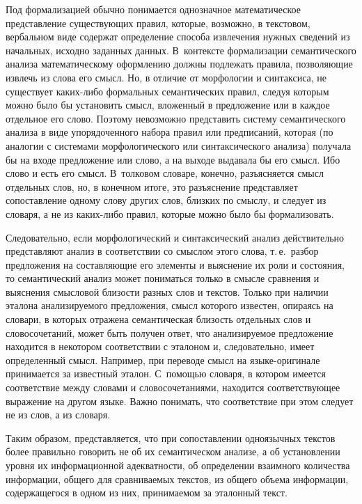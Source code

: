 \begin{multicols}{2}
   Под формализацией обычно понимается однозначное математическое 
представление существующих правил, которые, возможно, в текстовом, 
вербальном виде содержат определение способа извлечения нужных 
сведений из начальных, исходно заданных данных. В~контексте 
формализации семантического анализа математическому оформлению 
должны подлежать правила, позволяющие извлечь из слова его смысл. Но, в 
отличие от морфологии и синтаксиса, не существует ка\-ких-ли\-бо 
формальных семантических правил, следуя которым можно было бы 
установить смысл, вложенный в предложение или в каждое отдельное его 
слово. Поэтому невозможно представить систему семантического анализа в 
виде упорядоченного набора правил или предписаний, которая (по аналогии 
с системами морфологического или синтаксического анализа) получала бы 
на входе предложение или слово, а на выходе выдавала бы его смысл. Ибо 
слово и есть его смысл. В~толковом словаре, конечно, разъясняется смысл 
отдельных слов, но, в конечном итоге, это разъяснение представляет 
сопоставление одному слову других слов, близких по смыслу, и следует из 
словаря, а не из каких-либо правил, которые можно было бы формализовать.
   
Следовательно, если морфологический и синтаксический анализ действительно 
представляют анализ в соответствии со смыслом этого слова, т.\,е.\ разбор 
предложения на составляющие его элементы и выяснение их роли и 
состояния, то семантический анализ может пониматься только в смысле 
сравнения и выяснения смысловой близости разных слов и текстов. Только 
при наличии эталона анализируемого предложения, смысл которого 
известен, опираясь на словари, в которых отражена семантическая близость 
отдельных слов и словосочетаний, может быть получен ответ, что 
анализируемое предложение находится в некотором соответствии с эталоном 
и, следовательно, имеет определенный смысл. Например, при переводе 
смысл на язы\-ке-ори\-ги\-на\-ле принимается за известный эталон. С~помощью 
словаря, в котором имеется соответствие между словами и 
словосочетаниями, находится соответствующее выражение на другом языке. 
Важно понимать, что соответствие при этом следует не из слов, а из словаря. 
   
Таким образом, представляется, что при сопоставлении одноязычных текстов 
более правильно говорить не об их семантическом анализе, а об 
уста\-нов\-ле\-нии уровня их информационной адекватности, об определении 
взаимного количества информации, общего для сравниваемых текстов, из 
общего объема информации, содержащегося в одном из них, принимаемом за 
эталонный текст. 
   

\end{multicols}
